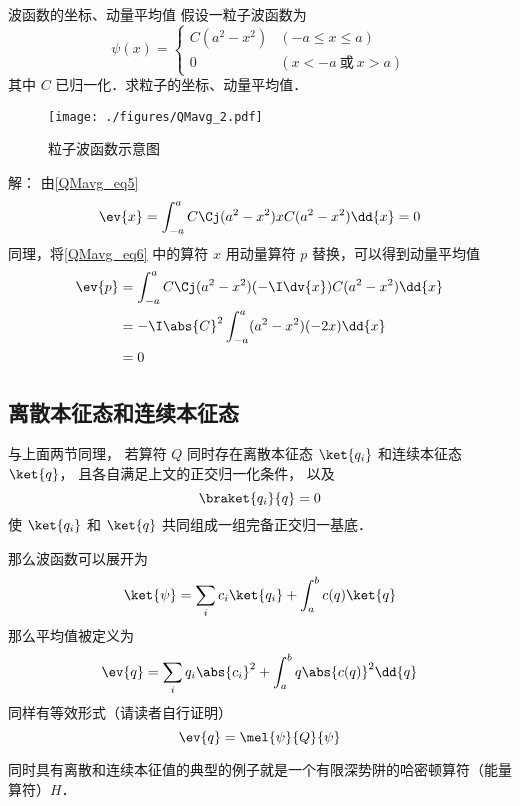 \begin{example}{波函数的坐标、动量平均值}
假设一粒子波函数为
\begin{equation}
\psi(x)=
\begin{cases}
C(a^2-x^2) &(-a\leqslant x\leqslant a)\\
0 &(x<-a \ \text{或}\ x>a) 
\end{cases}
\end{equation}
其中 $C$ 已归一化．求粒子的坐标、动量平均值．

\begin{figure}[ht]
\centering
\texttt{[image: ./figures/QMavg\_2.pdf]}
\caption{粒子波函数示意图} \label{QMavg_fig2}
\end{figure}

解： 由\autoref{QMavg_eq5} 
\begin{equation}\label{QMavg_eq6}
\ev{x}= \int_{-a}^a C\Cj(a^2-x^2)xC(a^2-x^2)\dd{x} = 0
\end{equation}
同理，将\autoref{QMavg_eq6} 中的算符 $x$ 用动量算符 $p$ 替换，可以得到动量平均值
\begin{equation}
\begin{aligned}
\ev{p} &= \int_{-a}^a C\Cj(a^2-x^2)(-\I\dv{x})C(a^2-x^2)\dd{x}\\
&= -\I\abs{C}^2\int_{-a}^a (a^2-x^2)(-2x)\dd{x}\\
&= 0
\end{aligned}
\end{equation}
\end{example}

\subsection{离散本征态和连续本征态}
与上面两节同理， 若算符 $Q$ 同时存在离散本征态 $\ket{q_i}$ 和连续本征态 $\ket{q}$， 且各自满足上文的正交归一化条件， 以及
\begin{equation}
\braket{q_i}{q} = 0
\end{equation}
使 $\ket{q_i}$ 和 $\ket{q}$ 共同组成一组完备正交归一基底．

那么波函数可以展开为
\begin{equation}
\ket{\psi} = \sum_i c_i \ket{q_i} + \int_a^b c(q) \ket{q}
\end{equation}
那么平均值被定义为
\begin{equation}
\ev{q} = \sum_i q_i \abs{c_i}^2 + \int_a^b q \abs{c(q)}^2 \dd{q}
\end{equation}
同样有等效形式（请读者自行证明）
\begin{equation}
\ev{q} = \mel{\psi}{Q}{\psi}
\end{equation}

同时具有离散和连续本征值的典型的例子就是一个有限深势阱的哈密顿算符（能量算符）$H$．

